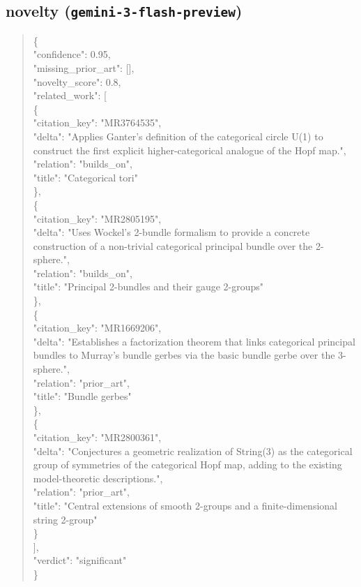 \documentclass[11pt]{article}
\begin{document}
\subsection*{novelty (\texttt{gemini-3-flash-preview})}
\begin{quote}\small\ttfamily\raggedright
\{\\
  "confidence": 0.95,\\
  "missing\_prior\_art": [],\\
  "novelty\_score": 0.8,\\
  "related\_work": [\\
    \{\\
      "citation\_key": "MR3764535",\\
      "delta": "Applies Ganter's definition of the categorical circle U(1) to construct the first explicit higher-categorical analogue of the Hopf map.",\\
      "relation": "builds\_on",\\
      "title": "Categorical tori"\\
    \},\\
    \{\\
      "citation\_key": "MR2805195",\\
      "delta": "Uses Wockel's 2-bundle formalism to provide a concrete construction of a non-trivial categorical principal bundle over the 2-sphere.",\\
      "relation": "builds\_on",\\
      "title": "Principal 2-bundles and their gauge 2-groups"\\
    \},\\
    \{\\
      "citation\_key": "MR1669206",\\
      "delta": "Establishes a factorization theorem that links categorical principal bundles to Murray's bundle gerbes via the basic bundle gerbe over the 3-sphere.",\\
      "relation": "prior\_art",\\
      "title": "Bundle gerbes"\\
    \},\\
    \{\\
      "citation\_key": "MR2800361",\\
      "delta": "Conjectures a geometric realization of String(3) as the categorical group of symmetries of the categorical Hopf map, adding to the existing model-theoretic descriptions.",\\
      "relation": "prior\_art",\\
      "title": "Central extensions of smooth 2-groups and a finite-dimensional string 2-group"\\
    \}\\
  ],\\
  "verdict": "significant"\\
\}\\
\end{quote}
\end{document}
